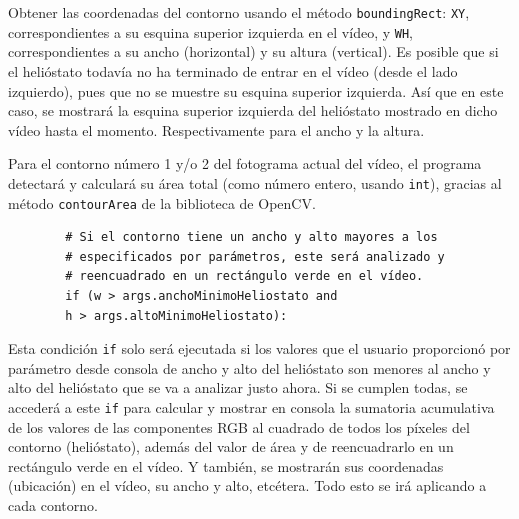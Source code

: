 Obtener las coordenadas del contorno usando el método \verb|boundingRect|: \verb|XY|, correspondientes a su esquina superior izquierda en el vídeo, y \verb|WH|, correspondientes a su ancho (horizontal) y su altura (vertical). Es posible que si el helióstato todavía no ha terminado de entrar en el vídeo (desde el lado izquierdo), pues que no se muestre su esquina superior izquierda. Así que en este caso, se mostrará la esquina superior izquierda del helióstato mostrado en dicho vídeo hasta el momento. Respectivamente para el ancho y la altura.

Para el contorno número 1 y/o 2 del fotograma actual del vídeo, el programa detectará y calculará su área total (como número entero, usando \verb|int|), gracias al método \verb|contourArea| de la biblioteca de OpenCV.\\[20pt]

\begin{lstlisting}
        # Si el contorno tiene un ancho y alto mayores a los
        # especificados por parámetros, este será analizado y
        # reencuadrado en un rectángulo verde en el vídeo.
        if (w > args.anchoMinimoHeliostato and
        h > args.altoMinimoHeliostato):
\end{lstlisting}

Esta condición \verb|if| solo será ejecutada si los valores que el usuario proporcionó por parámetro desde consola de ancho y alto del helióstato son menores al ancho y alto del helióstato que se va a analizar justo ahora. Si se cumplen todas, se accederá a este \verb|if| para calcular y mostrar en consola la sumatoria acumulativa de los valores de las componentes RGB al cuadrado de todos los píxeles del contorno (helióstato), además del valor de área y de reencuadrarlo en un rectángulo verde en el vídeo. Y también, se mostrarán sus coordenadas (ubicación) en el vídeo, su ancho y alto, etcétera. Todo esto se irá aplicando a cada contorno.\\[20pt]            

